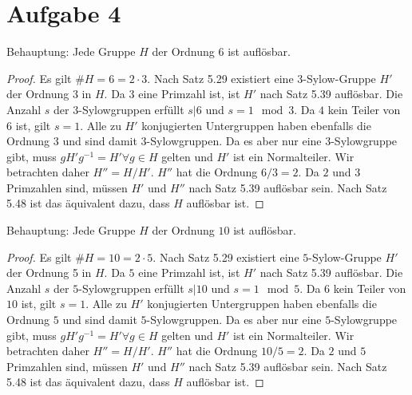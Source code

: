 \documentclass{article}
\begin{document}
\section*{Aufgabe 4}
Behauptung: Jede Gruppe $H$ der Ordnung $6$ ist auflösbar.
\begin{proof}
    Es gilt $\# H = 6 = 2\cdot 3$. Nach Satz 5.29 existiert eine $3$-Sylow-Gruppe $H'$ der Ordnung 3 in $H$.
    Da $3$ eine Primzahl ist, ist $H'$ nach Satz 5.39 auflösbar. 
    Die Anzahl $s$ der $3$-Sylowgruppen erfüllt $s | 6$ und $s = 1 \mod 3$.
    Da $4$ kein Teiler von $6$ ist, gilt $s = 1$.
    Alle zu $H'$ konjugierten Untergruppen haben ebenfalls die Ordnung $3$ und sind damit $3$-Sylowgruppen.
    Da es aber nur eine $3$-Sylowgruppe gibt, muss $gH'g^{-1} = H' \forall g \in H$ gelten und $H'$ ist ein Normalteiler.
    Wir betrachten daher $H'' = H/H'$. $H''$ hat die Ordnung $6/3 = 2$. Da $2$ und $3$ Primzahlen sind, müssen
    $H'$ und $H''$ nach Satz 5.39 auflösbar sein. Nach Satz 5.48 ist das äquivalent dazu, dass $H$ auflösbar ist.
\end{proof}
Behauptung: Jede Gruppe $H$ der Ordnung $10$ ist auflösbar.
\begin{proof}
    Es gilt $\# H = 10 = 2\cdot 5$. Nach Satz 5.29 existiert eine $5$-Sylow-Gruppe $H'$ der Ordnung 5 in $H$.
    Da $5$ eine Primzahl ist, ist $H'$ nach Satz 5.39 auflösbar. 
    Die Anzahl $s$ der $5$-Sylowgruppen erfüllt $s | 10$ und $s = 1 \mod 5$.
    Da $6$ kein Teiler von $10$ ist, gilt $s = 1$.
    Alle zu $H'$ konjugierten Untergruppen haben ebenfalls die Ordnung $5$ und sind damit $5$-Sylowgruppen.
    Da es aber nur eine $5$-Sylowgruppe gibt, muss $gH'g^{-1} = H' \forall g \in H$ gelten und $H'$ ist ein Normalteiler.
    Wir betrachten daher $H'' = H/H'$. $H''$ hat die Ordnung $10/5 = 2$. Da $2$ und $5$ Primzahlen sind, müssen
    $H'$ und $H''$ nach Satz 5.39 auflösbar sein. Nach Satz 5.48 ist das äquivalent dazu, dass $H$ auflösbar ist.
\end{proof}
\end{document}
